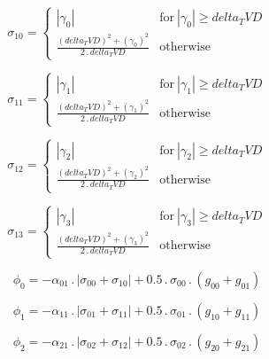 \documentclass{article}
\begin{document}
\begin{dmath}\sigma_{1 0} = \begin{cases} \left|{\gamma_{0}}\right| & \text{for}\: \left|{\gamma_{0}}\right| \geq delta_TVD \\\frac{\left(delta_TVD \right)^{2} + \left(\gamma_{0} \right)^{2}}{2 \,.\, delta_TVD} & \text{otherwise} 
\end{cases}\end{dmath}

\begin{dmath}\sigma_{1 1} = \begin{cases} \left|{\gamma_{1}}\right| & \text{for}\: \left|{\gamma_{1}}\right| \geq delta_TVD \\\frac{\left(delta_TVD \right)^{2} + \left(\gamma_{1} \right)^{2}}{2 \,.\, delta_TVD} & \text{otherwise} 
\end{cases}\end{dmath}

\begin{dmath}\sigma_{1 2} = \begin{cases} \left|{\gamma_{2}}\right| & \text{for}\: \left|{\gamma_{2}}\right| \geq delta_TVD \\\frac{\left(delta_TVD \right)^{2} + \left(\gamma_{2} \right)^{2}}{2 \,.\, delta_TVD} & \text{otherwise} 
\end{cases}\end{dmath}

\begin{dmath}\sigma_{1 3} = \begin{cases} \left|{\gamma_{3}}\right| & \text{for}\: \left|{\gamma_{3}}\right| \geq delta_TVD \\\frac{\left(delta_TVD \right)^{2} + \left(\gamma_{3} \right)^{2}}{2 \,.\, delta_TVD} & \text{otherwise} 
\end{cases}\end{dmath}

\begin{dmath}\phi_{0} = - \alpha_{01} \,.\, \left|{\sigma_{0 0} + \sigma_{1 0}}\right| + 0.5 \,.\, \sigma_{0 0} \,.\, \left(g_{00} + g_{01}\right)\end{dmath}

\begin{dmath}\phi_{1} = - \alpha_{11} \,.\, \left|{\sigma_{0 1} + \sigma_{1 1}}\right| + 0.5 \,.\, \sigma_{0 1} \,.\, \left(g_{10} + g_{11}\right)\end{dmath}

\begin{dmath}\phi_{2} = - \alpha_{21} \,.\, \left|{\sigma_{0 2} + \sigma_{1 2}}\right| + 0.5 \,.\, \sigma_{0 2} \,.\, \left(g_{20} + g_{21}\right)\end{dmath}
\end{document}
